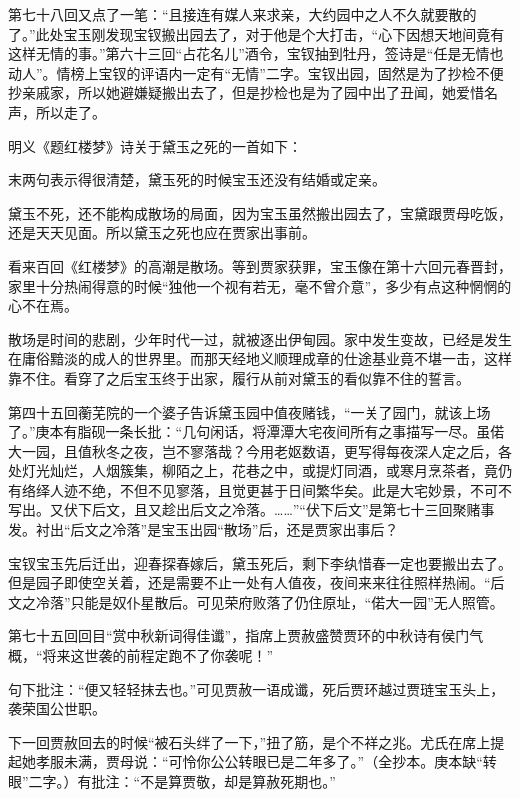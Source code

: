 \par 第七十八回又点了一笔：“且接连有媒人来求亲，大约园中之人不久就要散的了。”此处宝玉刚发现宝钗搬出园去了，对于他是个大打击，“心下因想天地间竟有这样无情的事。”第六十三回“占花名儿”酒令，宝钗抽到牡丹，签诗是“任是无情也动人”。情榜上宝钗的评语内一定有“无情”二字。宝钗出园，固然是为了抄检不便抄亲戚家，所以她避嫌疑搬出去了，但是抄检也是为了园中出了丑闻，她爱惜名声，所以走了。
\par 明义《题红楼梦》诗关于黛玉之死的一首如下：
\par 末两句表示得很清楚，黛玉死的时候宝玉还没有结婚或定亲。
\par 黛玉不死，还不能构成散场的局面，因为宝玉虽然搬出园去了，宝黛跟贾母吃饭，还是天天见面。所以黛玉之死也应在贾家出事前。
\par 看来百回《红楼梦》的高潮是散场。等到贾家获罪，宝玉像在第十六回元春晋封，家里十分热闹得意的时候“独他一个视有若无，毫不曾介意”，多少有点这种惘惘的心不在焉。
\par 散场是时间的悲剧，少年时代一过，就被逐出伊甸园。家中发生变故，已经是发生在庸俗黯淡的成人的世界里。而那天经地义顺理成章的仕途基业竟不堪一击，这样靠不住。看穿了之后宝玉终于出家，履行从前对黛玉的看似靠不住的誓言。
\par 第四十五回蘅芜院的一个婆子告诉黛玉园中值夜赌钱，“一关了园门，就该上场了。”庚本有脂砚一条长批：“几句闲话，将潭潭大宅夜间所有之事描写一尽。虽偌大一园，且值秋冬之夜，岂不寥落哉？今用老妪数语，更写得每夜深人定之后，各处灯光灿烂，人烟簇集，柳陌之上，花巷之中，或提灯同酒，或寒月烹茶者，竟仍有络绎人迹不绝，不但不见寥落，且觉更甚于日间繁华矣。此是大宅妙景，不可不写出。又伏下后文，且又趁出后文之冷落。……”“伏下后文”是第七十三回聚赌事发。衬出“后文之冷落”是宝玉出园“散场”后，还是贾家出事后？
\par 宝钗宝玉先后迁出，迎春探春嫁后，黛玉死后，剩下李纨惜春一定也要搬出去了。但是园子即使空关着，还是需要不止一处有人值夜，夜间来来往往照样热闹。“后文之冷落”只能是奴仆星散后。可见荣府败落了仍住原址，“偌大一园”无人照管。
\par 第七十五回回目“赏中秋新词得佳谶”，指席上贾赦盛赞贾环的中秋诗有侯门气概，“将来这世袭的前程定跑不了你袭呢！”
\par 句下批注：“便又轻轻抹去也。”可见贾赦一语成谶，死后贾环越过贾琏宝玉头上，袭荣国公世职。
\par 下一回贾赦回去的时候“被石头绊了一下，”扭了筋，是个不祥之兆。尤氏在席上提起她孝服未满，贾母说：“可怜你公公转眼已是二年多了。”（全抄本。庚本缺“转眼”二字。）有批注：“不是算贾敬，却是算赦死期也。”
